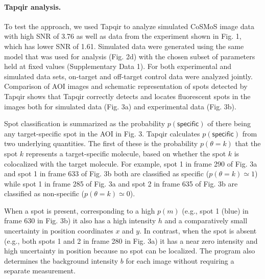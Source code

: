 \paragraph{Tapqir analysis.} %
To test the approach, we used Tapqir to analyze simulated CoSMoS image data with high SNR of 3.76 as well as data from the experiment shown in Fig. 1, which has lower SNR of 1.61. Simulated data were generated using the same model that was used for analysis (Fig. 2d) with the chosen subset of parameters held at fixed values (Supplementary Data 1). For both experimental and simulated data sets, on-target and off-target control data were analyzed jointly. Comparison of AOI images and schematic representation of spots detected by Tapqir shows that Tapqir correctly detects and locates fluorescent spots in the images both for simulated data (Fig. 3a) and experimental data (Fig. 3b).

Spot classification is summarized as the probability  $p(\mathsf{specific})$ of there being any target-specific spot in the AOI in Fig. 3. Tapqir calculates $p(\mathsf{specific})$ from two underlying quantities.  The first of these is the probability $p(\theta=k)$ that the spot $k$ represents a target-specific molecule, based on whether the spot $k$ is colocalized with the target molecule.  For example, spot 1 in frame 290 of Fig. 3a and spot 1 in frame 633 of Fig. 3b both are classified as specific ($p(\theta=k) \simeq 1$) while spot 1 in frame 285 of Fig. 3a and spot 2 in frame 635 of Fig. 3b are classified as non-specific ($p(\theta=k) \simeq 0$).  

When a spot is present, corresponding to a high $p(m)$ (e.g., spot 1 (blue) in frame 630 in Fig. 3b) it also has a high intensity $h$ and a comparatively small uncertainty in position coordinates $x$ and $y$. In contrast, when the spot is absent (e.g., both spots 1 and 2 in frame 280 in Fig. 3a) it has a near zero intensity and high uncertainty in position because no spot can be localized. The program also determines the background intensity $b$ for each image without requiring a separate measurement. 


